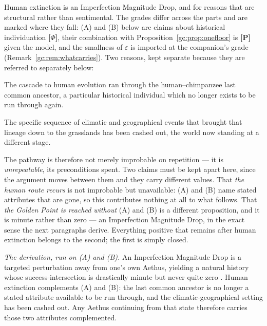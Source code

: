 \begin{example}
\label{gc:ex:humanIMD}
Human extinction is an Imperfection Magnitude Drop, and for reasons
that are structural rather than sentimental. The grades differ across
the parts and are marked where they fall: (A) and (B) below are claims
about historical individuation \textbf{[$\Phi$]}, their combination
with Proposition~\ref{gc:prop:onefloor} is \textbf{[P]} given the
model, and the smallness of $\varepsilon$ is imported at the
companion's grade (Remark~\ref{gc:rem:whatcarries}). Two reasons, kept
separate because they are referred to separately below:

\begin{description}\itemsep2pt
\item[\normalfont(A) \emph{The lineage is spent.}] The cascade to human
evolution ran through the human--chimpanzee last common ancestor, a
particular historical individual which no longer exists to be run
through again.
\item[\normalfont(B) \emph{The setting is spent.}] The specific sequence
of climatic and geographical events that brought that lineage down to
the grasslands has been cashed out, the world now standing at a
different stage.
\end{description}

\noindent The pathway is therefore not merely improbable on repetition
--- it is \emph{unrepeatable}, its preconditions spent. Two claims must be kept apart here, since the argument moves between
them and they carry different values. That \emph{the human route
recurs} is not improbable but unavailable: (A) and (B) name stated
attributes that are gone, so this contributes nothing at all to what
follows. That \emph{the Golden Point is reached without} (A) and (B) is
a different proposition, and it is minute rather than zero --- an
Imperfection Magnitude Drop, in the exact sense the next paragraphs
derive. Everything positive that remains after human extinction belongs
to the second; the first is simply closed.

\emph{The derivation, run on (A) and (B).} An Imperfection Magnitude
Drop is a targeted perturbation away from one's own Aethus, yielding a
natural history whose success-intersection is drastically minute but
never quite zero \cite[\S IMD]{Nexus}. Human extinction complements (A)
and (B): the last common ancestor is no longer a stated attribute
available to be run through, and the climatic-geographical setting has
been cashed out. Any Aethus continuing from that state therefore
carries those two attributes complemented.


\end{example}
